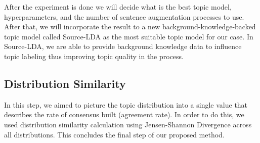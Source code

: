 \documentclass[10pt, conference, compsocconf]{IEEEtran}
\begin{document}
\begin{table}[t]
\caption{Topic Model Experiment}
\label{table 2: topic model experiment}
\end{table}

After the experiment is done we will decide what is the best topic model, hyperparameters, and the number of sentence augmentation processes to use. After that, we will incorporate the result to a new background-knowledge-backed topic model called Source-LDA\cite{b9} as the most suitable topic model for our case. In Source-LDA, we are able to provide background knowledge data to influence topic labeling thus improving topic quality in the process.

\subsection{Distribution Similarity}
In this step, we aimed to picture the topic distribution into a single value that describes the rate of consensus built (agreement rate). In order to do this, we used distribution similarity calculation using Jensen-Shannon Divergence across all distributions\cite{b10}. This concludes the final step of our proposed method.
\end{document}
